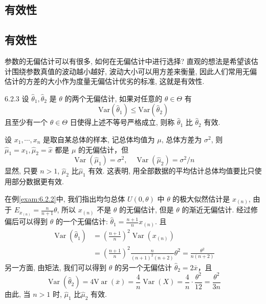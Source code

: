\subsection{有效性}

\subsection{有效性}\label{ssec:6.2.3}

参数的无偏估计可以有很多, 如何在无偏估计中进行选择? 直观的想法是希望该估计围绕参数真值的波动越小越好, 波动大小可以用方差来衡量, 因此人们常用无偏估计的方差的大小作为度量无偏估计优劣的标准, 这就是有效性.

\begin{definition}{}{6.2.3} %
设 $\hat{\theta}_1,\hat{\theta}_2$ 是 $\theta$ 的两个无偏估计, 如果对任意的 $\theta\in\Theta$ 有
\[\mathrm{Var}(\hat{\theta}_1)\leqslant\mathrm{Var}(\hat{\theta}_2)\]
且至少有一个 $\theta\in\Theta$ 日使得上述不等号严格成立, 则称 $\hat{\theta}_1$ 比 $\hat{\theta}_2$ 有效.
\end{definition}

\begin{example}\label{exam:6.2.6}
设 $x_1,\cdots,x_n$ 是取自某总体的样本, 记总体均值为 $\mu$, 总体方差为 $\sigma^2$, 则 $\hat{\mu}_1=x_1,\hat{\mu}_2=\hat{x}$ 都是 $\mu$ 的无偏估计，但
\[\operatorname{Var}\left(\hat{\mu}_{1}\right)=\sigma^{2}, \quad \operatorname{Var}\left(\hat{\mu}_{2}\right)=\sigma^{2} / n\]
显然, 只要 $n>1$, $\hat{\mu}_2$ 比$\hat{\mu}_1$ 有效. 这表明, 用全部数据的平均估计总体均值要比只使用部分数据更有效.
\end{example}

\begin{example}\label{exam:6.2.7}
在例\ref{exam:6.2.2}中, 我们指出均匀总体 $U(0,\theta)$ 中 $\theta$ 的极大似然估计是 $x_{(n)}$, 由于 $E_{x_{(n)}}=\frac{n}{n+1}\theta$, 所以 $x_{(n)}$ 不是 $\theta$ 的无偏估计, 但是 $\theta$ 的渐近无偏估计. 经过修偏后可以得到 $\theta$ 的一个无偏估计: $\hat{\theta}_1=\frac{n+1}{n}x_{(n)}$. 且
\begin{align*} 
\operatorname{Var}\left(\hat{\theta}_{1}\right) 
&=\left(\frac{n+1}{n}\right)^{2} \operatorname{Var}(x_{(n)}) \\ 
&=\left(\frac{n+1}{n}\right)^{2} \frac{n}{(n+1)^{2}(n+2)} \theta^{2}=\frac{\theta^{2}}{n(n+2)}
\end{align*}
另一方面, 由矩法, 我们可以得到 $\theta$ 的另一个无偏估计 $\hat{\theta}_2=2\bar x$，且
\[\operatorname{Var}(\hat{\theta}_{2})=4 \mathrm{V} \operatorname{ar}(\overline{x})=\frac{4}{n} \operatorname{Var}(X)=\frac{4}{n} \cdot \frac{\theta^{2}}{12}=\frac{\theta^{2}}{3 n}\]
由此, 当 $n>1$ 时, $\hat{\mu}_1$ 比$\hat{\mu}_2$ 有效.
\end{example}

